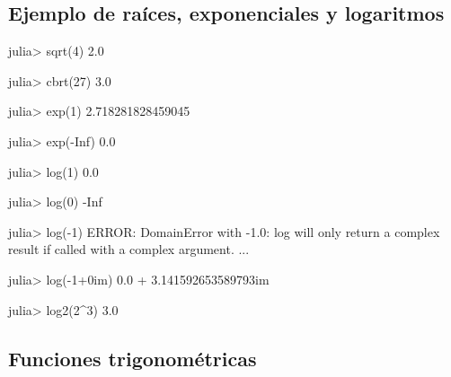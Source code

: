 \documentclass[
  letterpaper,
  DIV=11,
  numbers=noendperiod]{scrreprt}
\newenvironment{Shaded}{\begin{snugshade}}{\end{snugshade}}
\newcommand{\ConstantTok}[1]{\textcolor[rgb]{0.56,0.35,0.01}{#1}}
\newcommand{\ControlFlowTok}[1]{\textcolor[rgb]{0.00,0.23,0.31}{#1}}
\newcommand{\DataTypeTok}[1]{\textcolor[rgb]{0.68,0.00,0.00}{#1}}
\newcommand{\FloatTok}[1]{\textcolor[rgb]{0.68,0.00,0.00}{#1}}
\newcommand{\FunctionTok}[1]{\textcolor[rgb]{0.28,0.35,0.67}{#1}}
\newcommand{\NormalTok}[1]{\textcolor[rgb]{0.00,0.23,0.31}{#1}}
\newcommand{\OperatorTok}[1]{\textcolor[rgb]{0.37,0.37,0.37}{#1}}
\begin{document}
\hypertarget{ejemplo-de-rauxedces-exponenciales-y-logaritmos}{%
\subsection{Ejemplo de raíces, exponenciales y
logaritmos}\label{ejemplo-de-rauxedces-exponenciales-y-logaritmos}}

\begin{Shaded}
\begin{Highlighting}[]
\NormalTok{julia}\OperatorTok{\textgreater{}} \FunctionTok{sqrt}\NormalTok{(}\FloatTok{4}\NormalTok{)}
\FloatTok{2.0}

\NormalTok{julia}\OperatorTok{\textgreater{}} \FunctionTok{cbrt}\NormalTok{(}\FloatTok{27}\NormalTok{)}
\FloatTok{3.0}

\NormalTok{julia}\OperatorTok{\textgreater{}} \FunctionTok{exp}\NormalTok{(}\FloatTok{1}\NormalTok{)}
\FloatTok{2.718281828459045}

\NormalTok{julia}\OperatorTok{\textgreater{}} \FunctionTok{exp}\NormalTok{(}\OperatorTok{{-}}\ConstantTok{Inf}\NormalTok{)}
\FloatTok{0.0}

\NormalTok{julia}\OperatorTok{\textgreater{}} \FunctionTok{log}\NormalTok{(}\FloatTok{1}\NormalTok{)}
\FloatTok{0.0}

\NormalTok{julia}\OperatorTok{\textgreater{}} \FunctionTok{log}\NormalTok{(}\FloatTok{0}\NormalTok{)}
\OperatorTok{{-}}\ConstantTok{Inf}

\NormalTok{julia}\OperatorTok{\textgreater{}} \FunctionTok{log}\NormalTok{(}\OperatorTok{{-}}\FloatTok{1}\NormalTok{)}
\NormalTok{ERROR}\OperatorTok{:} \DataTypeTok{DomainError}\NormalTok{ with }\OperatorTok{{-}}\FloatTok{1.0}\OperatorTok{:}
\NormalTok{log will only }\ControlFlowTok{return}\NormalTok{ a complex result }\ControlFlowTok{if}\NormalTok{ called with a complex argument.}
\OperatorTok{...}

\NormalTok{julia}\OperatorTok{\textgreater{}} \FunctionTok{log}\NormalTok{(}\OperatorTok{{-}}\FloatTok{1}\OperatorTok{+}\FloatTok{0im}\NormalTok{)}
\FloatTok{0.0} \OperatorTok{+} \FloatTok{3.141592653589793im}

\NormalTok{julia}\OperatorTok{\textgreater{}} \FunctionTok{log2}\NormalTok{(}\FloatTok{2}\OperatorTok{\^{}}\FloatTok{3}\NormalTok{)}
\FloatTok{3.0}
\end{Highlighting}
\end{Shaded}

\hypertarget{funciones-trigonomuxe9tricas}{%
\subsection{Funciones
trigonométricas}\label{funciones-trigonomuxe9tricas}}
\end{document}
